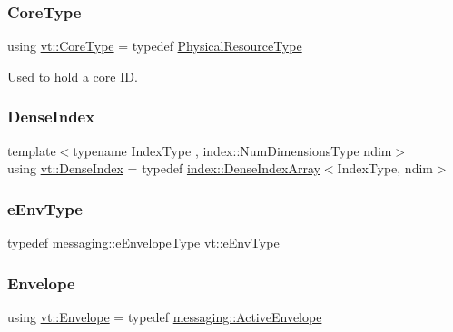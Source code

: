 \mbox{\label{namespacevt_a74b11b22c02feaabab8591acc87c7c52}} 
\subsubsection{\texorpdfstring{Core\+Type}{CoreType}}
{\footnotesize\ttfamily using \hyperlink{namespacevt_a74b11b22c02feaabab8591acc87c7c52}{vt\+::\+Core\+Type} = typedef \hyperlink{namespacevt_a2dc36fcada816dc6d11774d650328ee9}{Physical\+Resource\+Type}}



Used to hold a core ID. 

\mbox{\label{namespacevt_ac016d9c31465ce11c14eab2be11f9183}} 
\subsubsection{\texorpdfstring{Dense\+Index}{DenseIndex}}
{\footnotesize\ttfamily template$<$typename Index\+Type , index\+::\+Num\+Dimensions\+Type ndim$>$ \\
using \hyperlink{namespacevt_ac016d9c31465ce11c14eab2be11f9183}{vt\+::\+Dense\+Index} = typedef \hyperlink{structvt_1_1index_1_1_dense_index_array}{index\+::\+Dense\+Index\+Array}$<$Index\+Type, ndim$>$}

\mbox{\label{namespacevt_abdfe9ac50e3799705ee21853c1509bf6}} 
\subsubsection{\texorpdfstring{e\+Env\+Type}{eEnvType}}
{\footnotesize\ttfamily typedef \hyperlink{namespacevt_1_1messaging_a6508ef3a4701a2e6fd0bfe3edcc63a6c}{messaging\+::e\+Envelope\+Type} \hyperlink{namespacevt_1_1messaging_a6508ef3a4701a2e6fd0bfe3edcc63a6c}{vt\+::e\+Env\+Type}}

\mbox{\label{namespacevt_aa9c8cc094b5361482021d63012987814}} 
\subsubsection{\texorpdfstring{Envelope}{Envelope}}
{\footnotesize\ttfamily using \hyperlink{namespacevt_aa9c8cc094b5361482021d63012987814}{vt\+::\+Envelope} = typedef \hyperlink{structvt_1_1messaging_1_1_active_envelope}{messaging\+::\+Active\+Envelope}}


